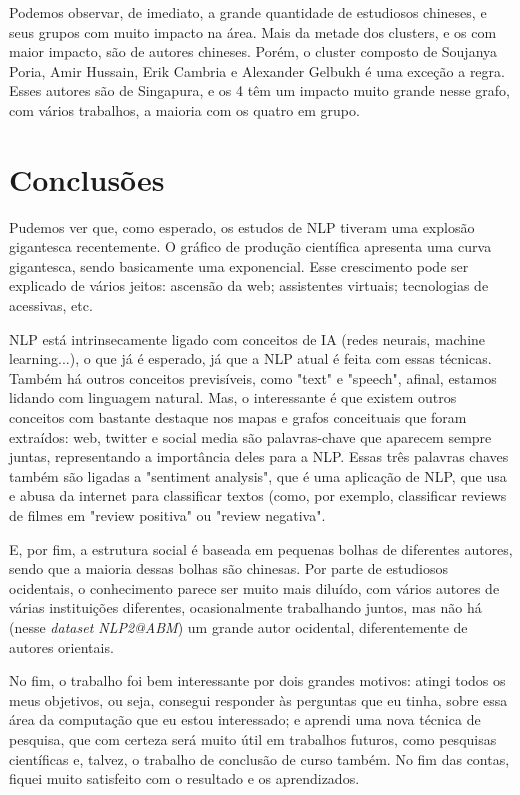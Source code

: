 Podemos observar, de imediato, a grande quantidade de estudiosos chineses, e seus grupos com muito impacto na área. Mais da metade dos clusters, e os com maior impacto, são de autores chineses. Porém, o cluster composto de Soujanya Poria, Amir Hussain, Erik Cambria e Alexander Gelbukh é uma exceção a regra. Esses autores são de Singapura, e os 4 têm um impacto muito grande nesse grafo, com vários trabalhos, a maioria com os quatro em grupo.

\section{Conclusões}

Pudemos ver que, como esperado, os estudos de NLP tiveram uma explosão gigantesca recentemente. O gráfico de produção científica apresenta uma curva gigantesca, sendo basicamente uma exponencial. Esse crescimento pode ser explicado de vários jeitos: ascensão da web; assistentes virtuais; tecnologias de acessivas, etc.

NLP está intrinsecamente ligado com conceitos de IA (redes neurais, machine learning...), o que já é esperado, já que a NLP atual é feita com essas técnicas. Também há outros conceitos previsíveis, como "text" e "speech", afinal, estamos lidando com linguagem natural. Mas, o interessante é que existem outros conceitos com bastante destaque nos mapas e grafos conceituais que foram extraídos: web, twitter e social media são palavras-chave que aparecem sempre juntas, representando a importância deles para a NLP. Essas três palavras chaves também são ligadas a "sentiment analysis", que é uma aplicação de NLP, que usa e abusa da internet para classificar textos (como, por exemplo, classificar reviews de filmes em "review positiva" ou "review negativa".

E, por fim, a estrutura social é baseada em pequenas bolhas de diferentes autores, sendo que a maioria dessas bolhas são chinesas. Por parte de estudiosos ocidentais, o conhecimento parece ser muito mais diluído, com vários autores de várias instituições diferentes, ocasionalmente trabalhando juntos, mas não há (nesse \textit{dataset NLP2@ABM}) um grande autor ocidental, diferentemente de autores orientais.

No fim, o trabalho foi bem interessante por dois grandes motivos: atingi todos os meus objetivos, ou seja, consegui responder às perguntas que eu tinha, sobre essa área da computação que eu estou interessado; e aprendi uma nova técnica de pesquisa, que com certeza será muito útil em trabalhos futuros, como pesquisas científicas e, talvez, o trabalho de conclusão de curso também. No fim das contas, fiquei muito satisfeito com o resultado e os aprendizados.